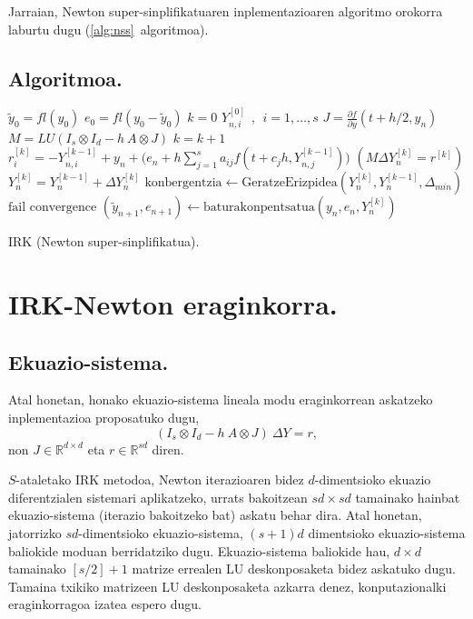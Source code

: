 Jarraian, Newton super-sinplifikatuaren inplementazioaren algoritmo orokorra laburtu dugu (\ref{alg:nss}~algoritmoa).

\subsection*{Algoritmoa.}

\begin{algorithm}[H]
 \BlankLine
  $\tilde{y}_0=fl(y_0)$\;
  $e_0=fl(y_0-\tilde{y}_0)$\;
  {
   \BlankLine
   $k=0$\;
    $Y_{n,i}^{[0]} \ \ , \ \ i=1,\dots,s $\;
   \BlankLine
   $J=\frac{\partial f}{\partial y}(t+h/2,y_n) $\; 
   $M=LU(I_s \otimes I_d - h \ A \otimes J)$\;
   \BlankLine
   {
    \BlankLine 
    $k=k+1$\;
    $r_i^{[k]}=-Y_{n,i}^{[k-1]}+y_n+\big(e_n+h \sum\limits_{j=1}^{s} a_{ij} f(t+c_jh,Y_{n,j}^{[k-1]})\big) $\;
     $(M \Delta Y_n^{[k]}=r^{[k]})$\;
    $Y_n^{[k]}=Y_n^{[k-1]}+\Delta Y_n^{[k]}$\;
    $\text{konbergentzia} \leftarrow \text{GeratzeErizpidea}(Y_n^{[k]},Y_n^{[k-1]},\Delta_{min}) $\;
   }
   \BlankLine
   {
     {$\text{fail convergence}$\;}
   }
   {$(\tilde y_{n+1},e_{n+1})\leftarrow \text{baturakonpentsatua}(y_n,e_n,Y_n^{[k]})$\;}    
 }
 \caption{IRK (Newton super-sinplifikatua).}
 \label{alg:nss}
\end{algorithm}



\section{IRK-Newton eraginkorra.}
\label{sec:7.3}

\subsection{Ekuazio-sistema.}

Atal honetan, honako ekuazio-sistema lineala modu eraginkorrean askatzeko inplementazioa proposatuko dugu,
\begin{equation}
\label{eq:linsys}
(I_s \otimes I_d - h \ A \otimes J) \ \Delta Y = r,
\end{equation}
non $J \in \mathbb{R}^{d \times d}$  eta $r \in \mathbb{R}^{sd}$ diren.

$S$-ataletako IRK metodoa, Newton iterazioaren bidez $d$-dimentsioko ekuazio diferentzialen sistemari aplikatzeko, urrats bakoitzean $sd \times sd$ tamainako hainbat ekuazio-sistema (iterazio bakoitzeko bat) askatu behar dira. Atal honetan, jatorrizko $sd$-dimentsioko ekuazio-sistema, $(s+1)d$ dimentsioko ekuazio-sistema baliokide moduan berridatziko dugu. Ekuazio-sistema baliokide hau,  $d \times d$ tamainako $[s/2]+1$ matrize errealen LU deskonposaketa bidez askatuko dugu. Tamaina txikiko matrizeen LU deskonposaketa azkarra denez, konputazionalki eraginkorragoa izatea espero dugu.      


